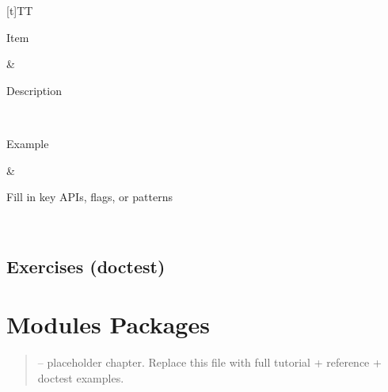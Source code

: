 \documentclass[a4paper,11pt,english]{sphinxmanual}
\begin{document}
\begin{savenotes}\sphinxattablestart
\sphinxthistablewithglobalstyle
\centering
\begin{tabulary}{\linewidth}[t]{TT}
\sphinxtoprule
\begin{varwidth}[t]{}
\sphinxstyletheadfamily \sphinxAtStartPar
Item
\sphinxbeforeendvarwidth
\end{varwidth}%
&\begin{varwidth}[t]{}
\sphinxstyletheadfamily \sphinxAtStartPar
Description
\sphinxbeforeendvarwidth
\end{varwidth}%
\\
\sphinxmidrule
\sphinxtableatstartofbodyhook\begin{varwidth}[t]{}
\sphinxAtStartPar
Example
\sphinxbeforeendvarwidth
\end{varwidth}%
&\begin{varwidth}[t]{}
\sphinxAtStartPar
Fill in key APIs, flags, or patterns
\sphinxbeforeendvarwidth
\end{varwidth}%
\\
\sphinxbottomrule
\end{tabulary}
\sphinxtableafterendhook\par
\sphinxattableend\end{savenotes}


\subsection{Exercises (doctest)}
\label{\detokenize{core_language/functions:exercises-doctest}}
\begin{sphinxVerbatim}[commandchars=\\\{\}]
\end{sphinxVerbatim}

\sphinxstepscope


\section{Modules Packages}
\label{\detokenize{core_language/modules_packages:modules-packages}}\label{\detokenize{core_language/modules_packages::doc}}\begin{quote}

\sphinxAtStartPar
{} – placeholder chapter. Replace this file with full tutorial + reference + doctest examples.
\end{quote}
\end{document}

